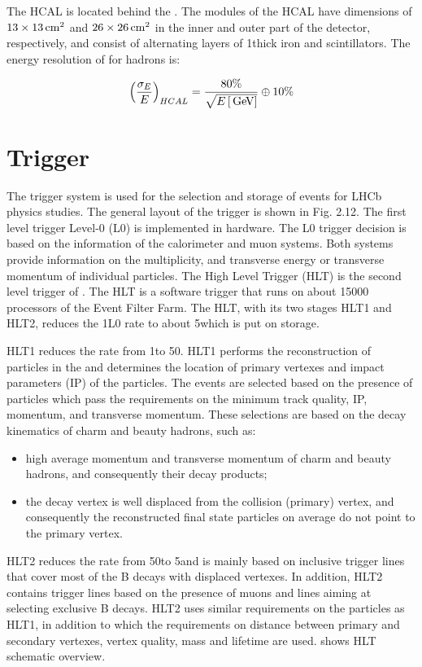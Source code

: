 The HCAL is located behind the \ecal. The modules of the HCAL have dimensions of
$13\times13\rm \,cm^2$ and $26\times26\rm \,cm^2$ in the inner and outer part of the
detector, respectively, and consist of alternating layers of 1\cm thick iron
and scintillators. The energy resolution of \hcal for hadrons is:

\begin{equation}
\left(\frac{\sigma_{E}}{E}\right)_{HCAL} = \frac{80\%}{\sqrt{E\left[\mathrm{\,Ge\kern -0.1em V}\right]}} \oplus 10\%
\label{eqn:ecal}
\end{equation}

\section{Trigger}

The \lhcb trigger system is used for the selection and storage of events for
LHCb physics studies. The general layout of the trigger is shown in Fig. 2.12.
The first level trigger Level-0 (L0) is implemented in hardware. The L0 trigger
decision is based on the information of the calorimeter and muon systems. Both
systems provide information on the multiplicity, and transverse energy \et or
transverse momentum \pt of individual particles. The High Level Trigger (HLT)
is the second level trigger of \lhcb. The HLT is a software trigger that runs on
about 15000 processors of the Event Filter Farm. The HLT, with its two stages
HLT1 and HLT2, reduces the 1\mhz L0 rate to about 5\khz which is put on
storage.

HLT1 reduces the rate from 1\mhz to 50\khz. HLT1 performs the reconstruction
of particles in the \velo and determines the location of primary vertexes and
impact parameters (IP) of the particles. The events are selected based on the
presence of particles which pass the requirements on the minimum track quality,
IP, momentum, and transverse momentum. These selections are based on the decay
kinematics of charm and beauty hadrons, such as:

\begin{itemize}
\item high average momentum and transverse momentum of charm and beauty
hadrons, and consequently their decay products;
\item the decay vertex is well displaced from the collision (primary) vertex, and
consequently the reconstructed final state particles on average do not point
to the primary vertex.
\end{itemize}

HLT2 reduces the rate from 50\khz to 5\khz and is mainly based on inclusive
trigger lines that cover most of the B decays with displaced vertexes. In
addition, HLT2 contains trigger lines based on the presence of muons and lines
aiming at selecting exclusive B decays. HLT2 uses similar requirements on the
particles as HLT1, in addition to which the requirements on distance between
primary and secondary vertexes, vertex quality, mass and lifetime are used.
 shows HLT schematic overview.

